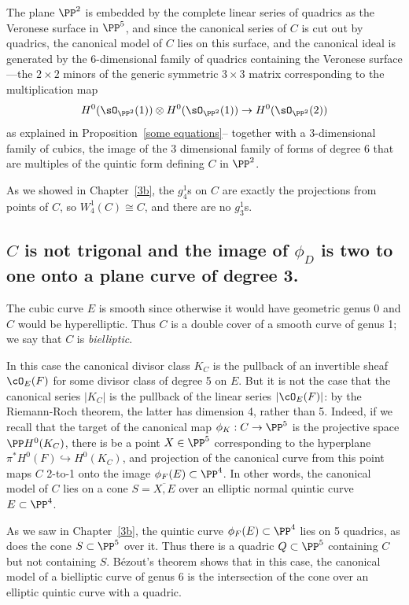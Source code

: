 The plane $\PP^2$ is embedded by the complete linear series of quadrics as the Veronese surface in $\PP^5$, and since the canonical series of $C$ is cut out by quadrics, the canonical model of $C$
lies on this surface, and the canonical ideal is generated by the 6-dimensional family of quadrics containing the Veronese surface---the $2\times 2$ minors of the generic symmetric $3\times 3$ matrix
corresponding to the multiplication map 
$$
H^{0}(\sO_{\PP^{2}}(1)) \otimes H^{0}(\sO_{\PP^{2}}(1)) \to H^{0}(\sO_{\PP^{2}}(2))
$$
as explained in Proposition~\ref{some equations}-- together with a 3-dimensional family of cubics,  the image of the 3 dimensional family of forms of degree 6 that are multiples of the quintic form defining $C$ in $\PP^2$.

As we showed in Chapter~\ref{3b}, the $g^1_4$s on $C$ are exactly the projections from points of $C$, so $W^1_4(C)\cong C$, and there are no 
$g^{1}_{3}$s.


\subsection{$C$ is not trigonal and the image of $\phi_{D}$ is two to one onto a  plane curve of degree 3.}

The cubic curve $E$ is smooth since otherwise it would have geometric genus 0 and $C$ would be  hyperelliptic. Thus $C$ is a double cover of a smooth curve of genus 1; we say that $C$ is \emph{bielliptic}.

In this case the canonical divisor class $K_C$ is the pullback of an invertible sheaf $\cO_E(F)$ for some divisor class of degree 5 on $E$. But it is not the case that the canonical series $|K_C|$ is the pullback of the linear series $|\cO_E(F)|$: by the Riemann-Roch theorem, the latter has dimension 4, rather than 5. Indeed, if we recall that the target of the canonical map $\phi_K : C \to \PP^5$ is the projective space $\PP H^0(K_C)$, there is be a point $X \in \PP^5$ corresponding to the hyperplane $\pi^*H^0(F) \hookrightarrow H^0(K_C)$, and projection of the canonical curve from this point maps $C$ 2-to-1 onto the image $\phi_F(E) \subset \PP^4$. In other words, the canonical model of $C$ lies on a cone $S = \overline{X, E}$ over an elliptic normal quintic curve $E \subset \PP^4$. 

As we saw in Chapter~\ref{3b}, the quintic curve $\phi_F(E) \subset \PP^4$ lies on 5 quadrics, as does the cone $S \subset \PP^5$ over it. Thus there is a quadric $Q \subset \PP^5$ containing $C$ but not containing $S$. B\'ezout's theorem shows that in this case, the canonical model of a bielliptic curve of genus 6 is the intersection of the cone over an elliptic quintic curve with a quadric.


